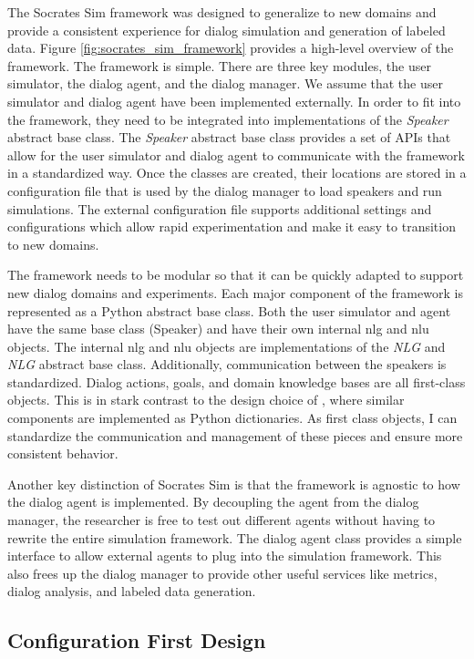 The Socrates Sim framework was designed to generalize to new domains and provide a consistent experience for dialog simulation and generation of labeled data. Figure \ref{fig:socrates_sim_framework} provides a high-level overview of the framework. The framework is simple. There are three key modules, the user simulator, the dialog agent, and the dialog manager. We assume that the user simulator and dialog agent have been implemented externally. In order to fit into the framework, they need to be integrated into implementations of the \textit{Speaker} abstract base class. The \textit{Speaker} abstract base class provides a set of APIs that allow for the user simulator and dialog agent to communicate with the framework in a standardized way. Once the classes are created, their locations are stored in a configuration file that is used by the dialog manager to load speakers and run simulations. The external configuration file supports additional settings and configurations which allow rapid experimentation and make it easy to transition to new domains.

The framework needs to be modular so that it can be quickly adapted to support new dialog domains and experiments. Each major component of the framework is represented as a Python abstract base class. Both the user simulator and agent have the same base class (Speaker) and have their own internal nlg and nlu objects. The internal nlg and nlu objects are implementations of the \textit{NLG} and \textit{NLG} abstract base class. Additionally, communication between the speakers is standardized. Dialog actions, goals, and domain knowledge bases are all first-class objects. This is in stark contrast to the design choice of \cite{li_end_to_end}, where similar components are implemented as Python dictionaries. As first class objects, I can standardize the communication and management of these pieces and ensure more consistent behavior.

Another key distinction of Socrates Sim is that the framework is agnostic to how the dialog agent is implemented. By decoupling the agent from the dialog manager, the researcher is free to test out different agents without having to rewrite the entire simulation framework.  The dialog agent class provides a simple interface to allow external agents to plug into the simulation framework. This also frees up the dialog manager to provide other useful services like metrics, dialog analysis, and labeled data generation.

\subsection{Configuration First Design} 

